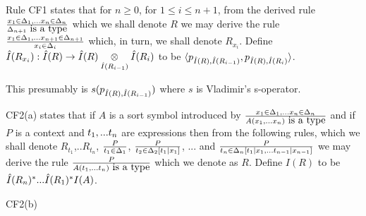 \begin{point}
Rule CF1 states that for $n \geq 0$, for $1 \leq i \leq n+1$, from the derived rule 
$\frac{\xDelta{n}}{\isT{\Delta_{n+1}}}$ which we shall denote $R$ 
we may derive the rule
$\frac{\xDelta{n+1}}{\ofT{x_i}{\Delta_i}}$ which, in turn, we shall denote $R_{x_i}$.
Define $\Ihat(R_{x_i}) :  \Ihat(R) \morph \crossx{\Ihat(R)}{\Ihat(R_i)}{\Ihat(R_{i-1})}$
to be $\tuple{p_{\Ihat(R),\Ihat(R_{i-1})},p_{\Ihat(R),\Ihat(R_{i})}}$. 

This presumably is $s(p_{\Ihat(R),\Ihat(R_{i-1})})$ where $s$ is Vladimir's s-operator.
\end{point}
\begin{point}
CF2(a) states that if $A$ is a sort symbol introduced by
$\frac{\xDelta{n}}{\isT{A(\xn)}}$ 
and if $P$ is a context and $\tn$ are expressions then from the following rules, which we shall denote $R_{t_1}$,..$R_{t_n}$,
$\frac{P}{\ofT{t_1}{\Delta_1}}$,
$\frac{P}{\ofT{t_2}{\Delta_2[t_1|x_1]}}$,
... and 
$\frac{P}{\ofT{t_n}{\Delta_n[t_1|x_1,...t_{n-1}|x_{n-1}]}}$
we may derive the rule
$\frac{P}{\isT{A(t_1,...t_n)}}$ which we denote as $R$. 
Define $I(R)$ to be $\Ihat(R_n)^*...\Ihat(R_1)^*I(A)$.
\end{point}
\begin{point}
CF2(b)
\end{point}

